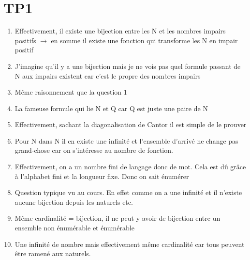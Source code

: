 \documentclass{report}
\begin{document}
\section{TP1}
\begin{enumerate}
\item Effectivement, il existe une bijection entre les N et les nombres impairs positifs $\rightarrow$ en somme il existe une fonction qui transforme les N en impair positif
\item J'imagine qu'il y a une bijection mais je ne vois pas quel formule passant de N aux impairs existent car c'est le propre des nombres impairs 
\item Même raisonnement que la question 1
\item La fameuse formule qui lie N et Q car Q est juste une paire de N
\item Effectivement, sachant la diagonalisation de Cantor il est simple de le prouver
\item Pour N dans N il en existe une infinité et l'ensemble d'arrivé ne change pas grand-chose car on s'intéresse au nombre de fonction.
\item Effectivement, on a un nombre fini de langage donc de mot. Cela est dû grâce à l'alphabet fini et la longueur fixe. Donc on sait énumérer
\item Question typique vu au cours. En effet comme on a une infinité et il n'existe aucune bijection depuis les naturels etc.
\item Même cardinalité = bijection, il ne peut y avoir de bijection entre un ensemble non énumérable et énumérable
\item Une infinité de nombre mais effectivement même cardinalité car tous peuvent être ramené aux naturels.


\end{enumerate}
\end{document}
